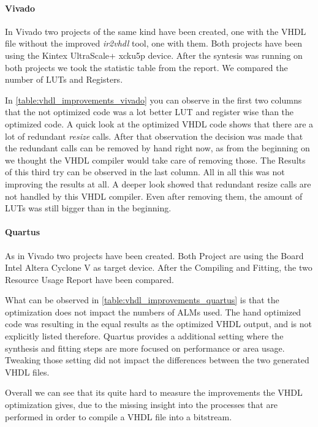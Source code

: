\paragraph{Vivado}
In Vivado two projects of the same kind have been created, one with the VHDL file without the improved \textit{ir2vhdl} tool, one with them. Both projects have been using the Kintex UltraScale+ xcku5p device. After the syntesis was running on both projects we took the statistic table from the report. We compared the number of LUTs and Registers. 

In \autoref{table:vhdl_improvements_vivado} you can observe in the first two columns that the not optimized code was a lot better LUT and register wise than the optimized code. A quick look at the optimized VHDL code shows that there are a lot of redundant \textit{resize} calls. After that observation the decision was made that the redundant calls can be removed by hand right now, as from the beginning on we thought the VHDL compiler would take care of removing those. The Results of this third try can be observed in the last column.
All in all this was not improving the results at all. A deeper look showed that redundant resize calls are not handled by this VHDL compiler. Even after removing them, the amount of LUTs was still bigger than in the beginning.

\paragraph{Quartus}
As in Vivado two projects have been created. Both Project are using the Board Intel Altera Cyclone V as target device. After the Compiling and Fitting, the two Resource Usage Report have been compared.

What can be observed in \autoref{table:vhdl_improvements_quartus} is that the optimization does not impact the numbers of ALMs used. The hand optimized code was resulting in the equal results as the optimized VHDL output, and is not explicitly listed therefore. Quartus provides a additional setting where the synthesis and fitting steps are more focused on performance or area usage. Tweaking those setting did not impact the differences between the two generated VHDL files.

Overall we can see that its quite hard to measure the improvements the VHDL optimization gives, due to the missing insight into the processes that are performed in order to compile a VHDL file into a bitstream.
